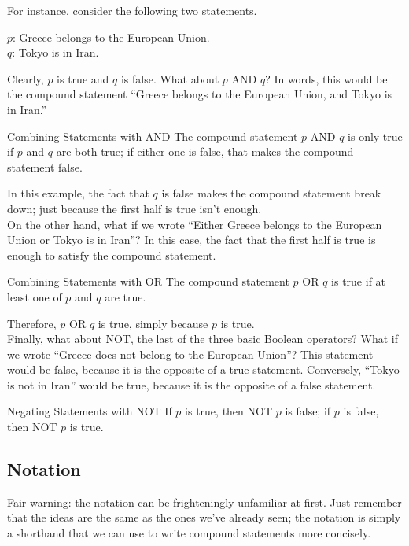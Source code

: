For instance, consider the following two statements.
\begin{center}
$p$: Greece belongs to the European Union.\\
$q$: Tokyo is in Iran.
\end{center}

Clearly, $p$ is true and $q$ is false.  What about $p$ AND $q$?  In words, this would be the compound statement ``Greece belongs to the European Union, and Tokyo is in Iran.''  

\begin{proc}{Combining Statements with AND}
The compound statement $p$ AND $q$ is only true if $p$ and $q$ are both true; if either one is false, that makes the compound statement false.
\end{proc}

In this example, the fact that $q$ is false makes the compound statement break down; just because the first half is true isn't enough.\\

On the other hand, what if we wrote ``Either Greece belongs to the European Union or Tokyo is in Iran''?  In this case, the fact that the first half is true is enough to satisfy the compound statement.

\begin{proc}{Combining Statements with OR}
The compound statement $p$ OR $q$ is true if at least one of $p$ and $q$ are true.
\end{proc}

Therefore, $p$ OR $q$ is true, simply because $p$ is true.\\

Finally, what about NOT, the last of the three basic Boolean operators?  What if we wrote ``Greece does not belong to the European Union''?  This statement would be false, because it is the opposite of a true statement.  Conversely, ``Tokyo is not in Iran'' would be true, because it is the opposite of a false statement.

\begin{proc}{Negating Statements with NOT}
If $p$ is true, then NOT $p$ is false; if $p$ is false, then NOT $p$ is true.
\end{proc}

\subsection{Notation}
Fair warning: the notation can be frighteningly unfamiliar at first.  Just remember that the ideas are the same as the ones we've already seen; the notation is simply a shorthand that we can use to write compound statements more concisely.

